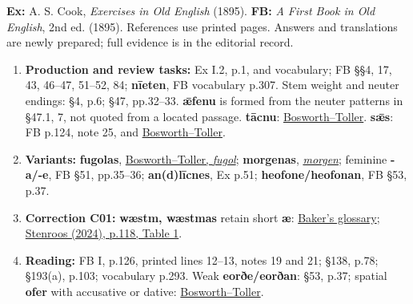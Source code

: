 \textbf{Ex:} A. S. Cook, \emph{Exercises in Old English} (1895). \textbf{FB:} \emph{A First Book in Old English}, 2nd ed. (1895). References use printed pages. Answers and translations are newly prepared; full evidence is in the editorial record.


\begin{enumerate}
\item[1.] \textbf{Production and review tasks:} Ex I.2, p.1, and vocabulary; FB §§4, 17, 43, 46–47, 51–52, 84; \textbf{nīeten}, FB vocabulary p.307. Stem weight and neuter endings: §4, p.6; §47, pp.32–33. \textbf{ǣfenu} is formed from the neuter patterns in §47.1, 7, not quoted from a located passage. \textbf{tācnu}: \href{https://bosworthtoller.com/58972}{Bosworth–Toller}. \textbf{sǣs}: FB p.124, note 25, and \href{https://bosworthtoller.com/26140}{Bosworth–Toller}.
\item[2.] \textbf{Variants:} \textbf{fugolas}, \href{https://bosworthtoller.com/12620}{Bosworth–Toller, \emph{fugol}}; \textbf{morgenas}, \href{https://bosworthtoller.com/23129}{\emph{morgen}}; feminine \textbf{-a/-e}, FB §51, pp.35–36; \textbf{an(d)līcnes}, Ex p.51; \textbf{heofone/heofonan}, FB §53, p.37.
\item[3.] \textbf{Correction C01:} \textbf{wæstm, wæstmas} retain short \textbf{æ}: \href{https://glossary.oldenglishaerobics.net/oeaginfo.php?objid=xwaestm\&objtype=gentry}{Baker's glossary}; \href{https://doi.org/10.17811/selim.29.2024.109-25}{Stenroos (2024), p.118, Table 1}.
\item[4.] \textbf{Reading:} FB I, p.126, printed lines 12–13, notes 19 and 21; §138, p.78; §193(a), p.103; vocabulary p.293. Weak \textbf{eorðe/eorðan}: §53, p.37; spatial \textbf{ofer} with accusative or dative: \href{https://bosworthtoller.com/24000}{Bosworth–Toller}.
\end{enumerate}

\endgroup


